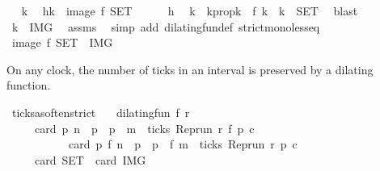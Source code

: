 \begin{isabellebody}
\ \isamarkupfalse%
\ k\ \isamarkupfalse%
\ h{\isacharcolon}{\isacartoucheopen}k\ {\isasymin}\ image\ f\ {\isacharquery}SET{\isacartoucheclose}\isanewline
\ \ \ \ \isamarkupfalse%
\ h\ \isamarkupfalse%
\ k\ \ k{}prop{\isacharcolon}{\isacartoucheopen}k\ {\isacharequal}\ f\ k\ {\isasymand}\ k\ {\isasymin}\ {\isacharquery}SET{\isacartoucheclose}\ \isamarkupfalse%
\ blast\isanewline
\ \ \ \ \isamarkupfalse%
\ {\isacartoucheopen}k\ {\isasymin}\ {\isacharquery}IMG{\isacartoucheclose}\ \isamarkupfalse%
\ assms\ \isamarkupfalse%
\ {\isacharparenleft}simp\ add{\isacharcolon}\ dilating{\isacharunderscore}fun{\isacharunderscore}def\ strict{\isacharunderscore}mono{\isacharunderscore}less{\isacharunderscore}eq{\isacharparenright}\isanewline
\ \ \isacommand{{\isacharbraceright}}\isamarkupfalse%
\ \isamarkupfalse%
\ {\isacartoucheopen}image\ f\ {\isacharquery}SET\ {\isasymsubseteq}\ {\isacharquery}IMG{\isacartoucheclose}\ \isacommand{{\isachardot}{\isachardot}}\isamarkupfalse%
\isanewline
{}\isamarkupfalse%
%
\endisatagproof
{\isafoldproof}%
%
\isadelimproof
%
\endisadelimproof
%
\begin{isamarkuptext}%
On any clock, the number of ticks in an interval is preserved
  by a dilating function.%
\end{isamarkuptext}\isamarkuptrue%
\isamarkupfalse%
\ ticks{\isacharunderscore}as{\isacharunderscore}often{\isacharunderscore}strict{\isacharcolon}\isanewline
\ \ \ {\isacartoucheopen}dilating{\isacharunderscore}fun\ f\ r{\isacartoucheclose}\isanewline
\ \ \ \ \ {\isacartoucheopen}card\ {\isacharbraceleft}p{\isachardot}\ n\ {\isacharless}\ p\ {\isasymand}\ p\ {\isacharless}\ m\ {\isasymand}\ ticks\ {\isacharparenleft}{\isacharparenleft}Rep{\isacharunderscore}run\ r{\isacharparenright}\ {\isacharparenleft}f\ p{\isacharparenright}\ c{\isacharparenright}{\isacharbraceright}\isanewline
\ \ \ \ \ \ \ \ \ \ {\isacharequal}\ card\ {\isacharbraceleft}p{\isachardot}\ f\ n\ {\isacharless}\ p\ {\isasymand}\ p\ {\isacharless}\ f\ m\ {\isasymand}\ ticks\ {\isacharparenleft}{\isacharparenleft}Rep{\isacharunderscore}run\ r{\isacharparenright}\ p\ c{\isacharparenright}{\isacharbraceright}{\isacartoucheclose}\isanewline
\ \ \ \ {\isacharparenleft}\ {\isacartoucheopen}card\ {\isacharquery}SET\ {\isacharequal}\ card\ {\isacharquery}IMG{\isacartoucheclose}{\isacharparenright}\isanewline

\end{isabellebody}
